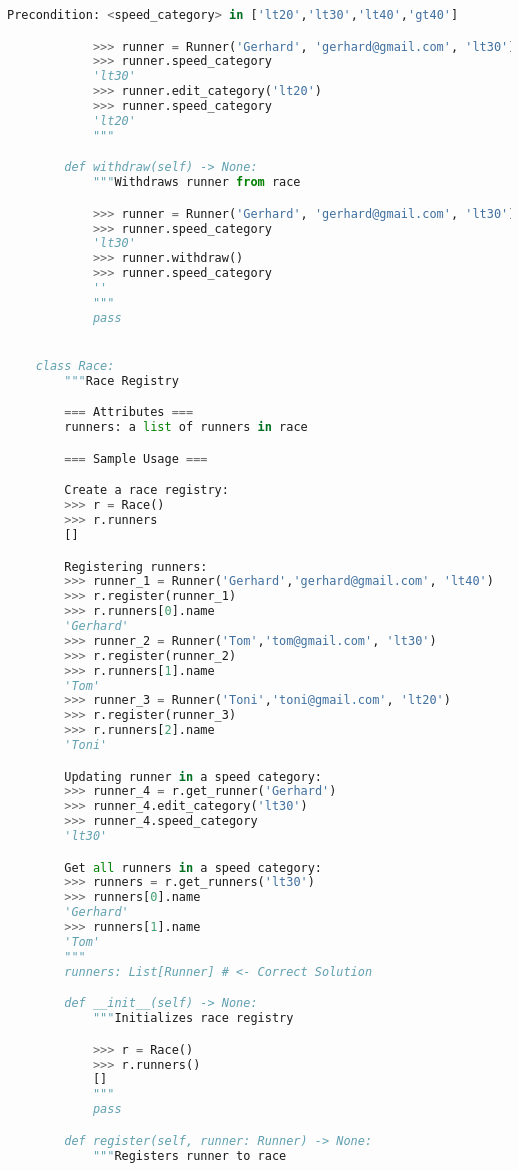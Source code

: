 \documentclass[12pt]{article}
\begin{document}
\begin{enumerate}[1.]
\begin{mdframed}
\begin{lstlisting}[language=Python]
            Precondition: <speed_category> in ['lt20','lt30','lt40','gt40']

            >>> runner = Runner('Gerhard', 'gerhard@gmail.com', 'lt30')
            >>> runner.speed_category
            'lt30'
            >>> runner.edit_category('lt20')
            >>> runner.speed_category
            'lt20'
            """

        def withdraw(self) -> None:
            """Withdraws runner from race

            >>> runner = Runner('Gerhard', 'gerhard@gmail.com', 'lt30')
            >>> runner.speed_category
            'lt30'
            >>> runner.withdraw()
            >>> runner.speed_category
            ''
            """
            pass


    class Race:
        """Race Registry

        === Attributes ===
        runners: a list of runners in race

        === Sample Usage ===

        Create a race registry:
        >>> r = Race()
        >>> r.runners
        []

        Registering runners:
        >>> runner_1 = Runner('Gerhard','gerhard@gmail.com', 'lt40')
        >>> r.register(runner_1)
        >>> r.runners[0].name
        'Gerhard'
        >>> runner_2 = Runner('Tom','tom@gmail.com', 'lt30')
        >>> r.register(runner_2)
        >>> r.runners[1].name
        'Tom'
        >>> runner_3 = Runner('Toni','toni@gmail.com', 'lt20')
        >>> r.register(runner_3)
        >>> r.runners[2].name
        'Toni'

        Updating runner in a speed category:
        >>> runner_4 = r.get_runner('Gerhard')
        >>> runner_4.edit_category('lt30')
        >>> runner_4.speed_category
        'lt30'

        Get all runners in a speed category:
        >>> runners = r.get_runners('lt30')
        >>> runners[0].name
        'Gerhard'
        >>> runners[1].name
        'Tom'
        """
        runners: List[Runner] # <- Correct Solution

        def __init__(self) -> None:
            """Initializes race registry

            >>> r = Race()
            >>> r.runners()
            []
            """
            pass

        def register(self, runner: Runner) -> None:
            """Registers runner to race


\end{lstlisting}
\end{mdframed}
\end{enumerate}
\end{document}
